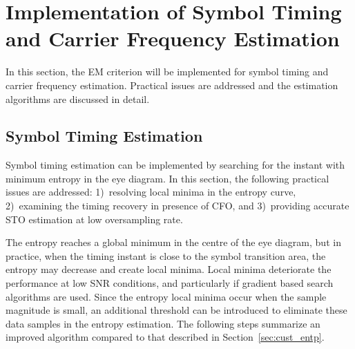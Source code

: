 \documentclass[12pt, draftclsnofoot, onecolumn]{IEEEtran}
\begin{document}
\section{Implementation of Symbol Timing and Carrier Frequency Estimation}
\label{sec:imple}
In this section, the EM criterion will be implemented for symbol timing and carrier frequency estimation.
Practical issues are addressed and the estimation algorithms are discussed in detail. 

\subsection{Symbol Timing Estimation} 
\label{sec:timing}
Symbol timing estimation can be implemented by searching for the instant with minimum entropy in the eye diagram.
In this section, the following practical issues are addressed:
1)~resolving local minima in the entropy curve,  
2)~examining the timing recovery in presence of CFO, and 
3)~providing accurate STO estimation at low oversampling rate.

The entropy reaches a global minimum in the centre of the eye diagram, but in practice, when the timing instant is close to the symbol transition area, the entropy may decrease and create local minima. 
Local minima deteriorate the performance at low SNR conditions, and particularly if gradient based search algorithms are used.
Since the entropy local minima occur when the sample magnitude is small, 
an additional threshold can be introduced to eliminate these data samples in the entropy estimation.
The following steps summarize an improved algorithm compared to that described in Section~\ref{sec:cust_entp}.
\end{document}
